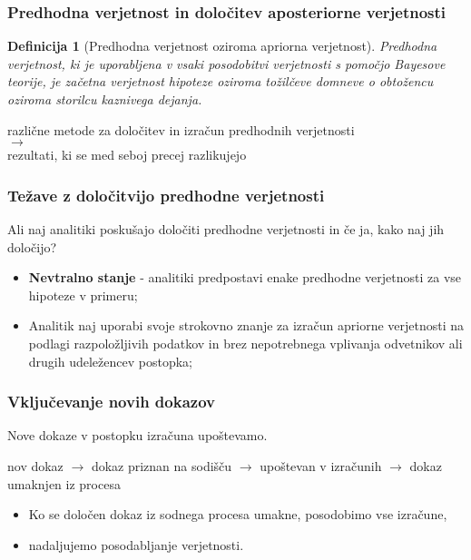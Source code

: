 \documentclass{beamer}
\newtheorem{definicija}{Definicija}
\begin{document}
\begin{frame}
   \frametitle{Predhodna verjetnost in določitev aposteriorne verjetnosti}
   \begin{definicija}[Predhodna verjetnost oziroma apriorna verjetnost]
      Predhodna verjetnost, ki je uporabljena v vsaki posodobitvi verjetnosti s pomočjo Bayesove teorije, je začetna verjetnost hipoteze 
      oziroma tožilčeve domneve o obtožencu oziroma storilcu kaznivega dejanja.
  \end{definicija} \vspace{3mm}
  \begin{block}{}
   \centering
   različne metode za določitev in izračun predhodnih verjetnosti\\ \vspace{2mm}
   $\rightarrow$ \\ \vspace{3mm}
   rezultati, ki se med seboj precej razlikujejo
   \end{block}
\end{frame}

\begin{frame}
   \frametitle{Težave z določitvijo predhodne verjetnosti}
   \begin{block}{Ali naj analitiki poskušajo določiti predhodne verjetnosti in če ja, kako naj jih določijo?}
       \begin{itemize}
           \item \textbf{Nevtralno stanje} - analitiki predpostavi enake predhodne verjetnosti za vse hipoteze v primeru;
           \item Analitik naj uporabi svoje strokovno znanje za izračun apriorne verjetnosti na podlagi razpoložljivih podatkov in brez nepotrebnega vplivanja odvetnikov ali drugih udeležencev postopka;
       \end{itemize}
   \end{block}
\end{frame}

\begin{frame}
   \frametitle{Vključevanje novih dokazov}
   Nove dokaze v postopku izračuna upoštevamo. \vspace{3mm}
   \begin{block}{}
      \centering
      nov dokaz $\rightarrow$  dokaz priznan na sodišču $\rightarrow$ upoštevan v izračunih $\rightarrow$ dokaz umaknjen iz procesa
      \vspace{3mm}
   \end{block}
   \begin{itemize}
      \item Ko se določen dokaz iz sodnega procesa umakne, posodobimo vse izračune,
      \item nadaljujemo posodabljanje verjetnosti.
   \end{itemize}
\end{frame}
\end{document}
